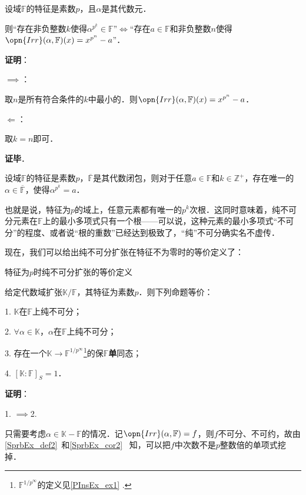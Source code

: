 \begin{lemma}{}
设域$\mathbb{F}$的特征是素数$p$，且$\alpha$是其代数元．

则“存在非负整数$k$使得$\alpha^{p^k}\in\mathbb{F}$”$\iff$“存在$a\in\mathbb{F}$和非负整数$n$使得$\opn{Irr}(\alpha, \mathbb{F})(x) = x^{p^n}-a$”．

\end{lemma}

\textbf{证明}：

$\implies$：

取$n$是所有符合条件的$k$中最小的．则$\opn{Irr}(\alpha, \mathbb{F})(x) = x^{p^n}-a$．

$\Leftarrow$：

取$k=n$即可．

\textbf{证毕}．

\begin{corollary}{}\label{PInsEx_cor1}
设域$\mathbb{F}$的特征是素数$p$，$\overline{\mathbb{F}}$是其代数闭包，则对于任意$a\in\mathbb{F}$和$k\in\mathbb{Z}^+$，存在唯一的$\alpha\in\overline{\mathbb{F}}$，使得$\alpha^{p^k}=a$．
\end{corollary}

也就是说，特征为$p$的域上，任意元素都有唯一的$p^k$次根．这同时意味着，纯不可分元素在$\mathbb{F}$上的最小多项式只有一个根——可以说，这种元素的最小多项式“不可分”的程度、或者说“根的重数”已经达到极致了，“纯”不可分确实名不虚传．


现在，我们可以给出纯不可分扩张在特征不为零时的等价定义了：




\begin{theorem}{特征为$p$时纯不可分扩张的等价定义}\label{PInsEx_the1}


给定代数域扩张$\mathbb{K}/\mathbb{F}$，其特征为素数$p$．则下列命题等价：

1. $\mathbb{K}$在$\mathbb{F}$上纯不可分；

2. $\forall \alpha\in\mathbb{K}$，$\alpha$在$\mathbb{F}$上纯不可分；

3. 存在一个$\mathbb{K}\to\mathbb{F}^{1/p^\infty}$\footnote{$\mathbb{F}^{1/p^\infty}$的定义见\autoref{PInsEx_ex1} .}的保$\mathbb{F}$\textbf{单}同态；

4. $[\mathbb{K}:\mathbb{F}]_S=1$．


\end{theorem}

\textbf{证明}：

1. $\implies$2. 

只需要考虑$\alpha\in\mathbb{K}-\mathbb{F}$的情况．记$\opn{Irr}(\alpha, \mathbb{F})=f$，则$f$不可分、不可约，故由\autoref{SprbEx_def2}~和\autoref{SprbEx_cor2}~ 知，可以把$f$中次数不是$p$整数倍的单项式挖掉．

